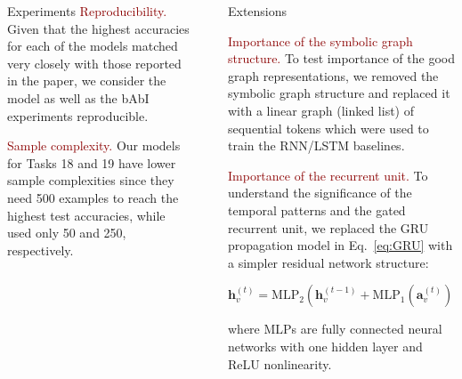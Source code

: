 \documentclass[final,hyperref={pdfpagelabels=false}]{beamer}
\newcommand{\shrink}{-15pt}
\begin{document}
\begin{frame}[t]
\begin{columns}[t]
\begin{column}{.3\textwidth}
\begin{block}{Experiments}
        \textcolor{darkred}{Reproducibility.} Given that the highest accuracies for each of the models matched very closely with those reported in the paper, we consider the model as well as the bAbI experiments reproducible.
        
        \textcolor{darkred}{Sample complexity.} Our models for Tasks 18 and 19 have lower sample complexities since they need 500 examples to reach the highest test accuracies, while~\cite{DBLP:journals/corr/LiTBZ15} used only 50 and 250, respectively.

    \end{block}
    

  \end{column} %


  \begin{column}{.02\textwidth}\end{column} %
    
  \begin{column}{.3\textwidth} %
  
  \vspace{\shrink}
    
    \begin{block}{Extensions}

      \textcolor{darkred}{Importance of the symbolic graph structure.} To test importance of the good graph representations, we removed the symbolic graph structure and replaced it with a linear graph (linked list) of sequential tokens which were used to train the RNN/LSTM baselines.
      \vspace{0.2in}
    
      \textcolor{darkred}{Importance of the recurrent unit.} To understand the significance of the temporal patterns and the gated recurrent unit, we replaced the GRU propagation model in Eq.~\eqref{eq:GRU} with a simpler residual network structure:

      \begin{equation}
        \mathbf{h}_v^{(t)} = \mathrm{MLP}_2\left( \mathbf{h}_v^{(t-1)} + \mathrm{MLP}_1\left( \mathbf{a}_v^{(t)} \right) \right),
      \end{equation}

      where $\mathrm{MLP}$s are fully connected neural networks with one hidden layer and ReLU nonlinearity. 
      

\end{block}
\end{column}
\end{columns}
\end{frame}
\end{document}
